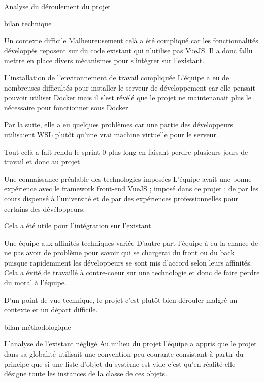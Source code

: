 \documentclass[]{article}
\begin{document}
{\begin{section}{Analyse du déroulement du projet}
\begin{subsection}{bilan technique}
\begin{subsubsection}{Un contexte difficile}
         Malheureusement celà a été compliqué car les fonctionnalités développés reposent sur du code existant qui n'utilise pas VueJS. Il a donc fallu mettre en place divers mécanismes pour s'intégrer sur l'existant.
     \end{subsubsection}

     \begin{subsubsection}{L'installation de l'environnement de travail compliquée}
         L'équipe a eu de nombreuses difficultés pour installer le serveur de développement car elle pensait pouvoir utiliser Docker mais il s'est révélé que le projet ne maintenanait plus le nécessaire pour fonctionner sous Docker.

         Par la suite, elle a eu quelques problèmes car une partie des développeurs utilisaient WSL plutôt qu'une vrai machine virtuelle pour le serveur.

         Tout celà a fait rendu le sprint 0 plus long en faisant perdre plusieurs jours de travail et donc au projet.
     \end{subsubsection}

     \begin{subsubsection}{Une connaissance préalable des technologies imposées }
         L'équipe avait une bonne expérience avec le framework front-end VueJS ; imposé dans ce projet ; de par les cours dispensé à l'université et de par des expériences professionnelles pour certains des dévéloppeurs.

         Cela a été utile pour l'intégration sur l'existant.
     \end{subsubsection}

     \begin{subsubsection}{Une équipe aux affinités techniques variée }
         D'autre part l'équipe à eu la chance de ne pas avoir de problème pour savoir qui se chargerai du front ou du back puisque rapidemment les développeurs se sont mis d'accord selon leurs affinités. Cela a évité de travaillé à contre-coeur sur une technologie et donc de faire perdre du moral à l'équipe.
     \end{subsubsection}

     D'un point de vue technique, le projet c'est plutôt bien dérouler malgré un contexte et un départ difficile.
 \end{subsection}

 \begin{subsection}{bilan méthodologique}
     \begin{subsubsection}{L'analyse de l'existant négligé}
         Au milieu du projet l'équipe a appris que le projet dans sa globalité utilisait une convention peu courante consistant à partir du principe que si une liste d'objet du système est vide c'est qu'en réalité elle désigne toute les instances de la classe de ces objets.


\end{subsubsection}
\end{subsection}
\end{section}}
\end{document}

